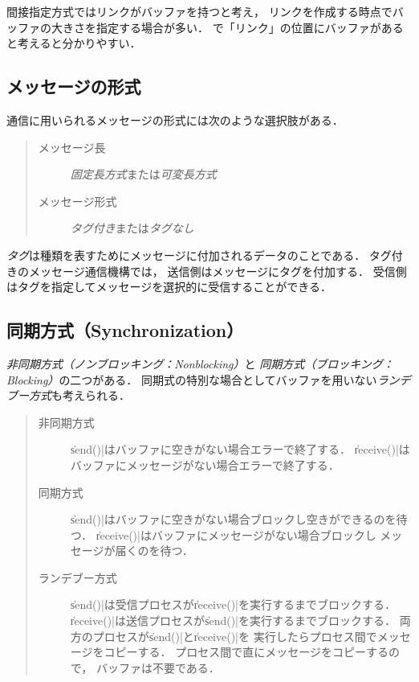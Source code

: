 間接指定方式ではリンクがバッファを持つと考え，
リンクを作成する時点でバッファの大きさを指定する場合が多い．
で「リンク」の位置にバッファがあると考えると分かりやすい．

\subsection{メッセージの形式}
通信に用いられるメッセージの形式には次のような選択肢がある．

\begin{quote}
  \begin{description}
  \item [メッセージ長] \emph{固定長方式}または\emph{可変長方式}
  \item [メッセージ形式] \emph{タグ付き}または\emph{タグなし}
  \end{description}
\end{quote}

\emph{タグ}は種類を表すためにメッセージに付加されるデータのことである．
タグ付きのメッセージ通信機構では，
送信側はメッセージにタグを付加する．
受信側はタグを指定してメッセージを選択的に受信することができる．

\subsection{同期方式（Synchronization）}
\emph{非同期方式（ノンブロッキング：Nonblocking）}と
\emph{同期方式（ブロッキング：Blocking）}の二つがある．
同期式の特別な場合としてバッファを用いない\emph{ランデブー方式}も考えられる．

\begin{quote}
  \begin{description}
  \item [非同期方式]
    \|send()|はバッファに空きがない場合エラーで終了する．
    \|receive()|はバッファにメッセージがない場合エラーで終了する．
  \item [同期方式]
    \|send()|はバッファに空きがない場合ブロックし空きができるのを待つ．
    \|receive()|はバッファにメッセージがない場合ブロックし
    メッセージが届くのを待つ．
  \item [ランデブー方式]
    \|send()|は受信プロセスが\|receive()|を実行するまでブロックする．
    \|receive()|は送信プロセスが\|send()|を実行するまでブロックする．
    両方のプロセスが\|send()|と\|receive()|を
    実行したらプロセス間でメッセージをコピーする．
    プロセス間で直にメッセージをコピーするので，
    バッファは不要である．
  \end{description}
\end{quote}

